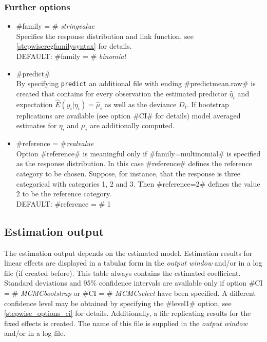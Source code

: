 \subsubsection*{Further options}
\label{stepwisereg_further_options}

\begin{itemize}
\item #family = # {\em stringvalue} \\
 Specifies the response distribution and link function, see \autoref{stepwiseregfamilysyntax} for details. \\
DEFAULT: #family = # {\em binomial}
\item  #predict# \\
By specifying {\tt predict} an
additional file with ending #predictmean.raw# is created that contains for
every observation the estimated predictor $\hat \eta_i$ and
expectation $\hat E(y_i | \eta_i) = \hat \mu_i$ as well as the
deviance $D_i$.  If bootstrap replications are available (see option #CI# for details) model averaged estimates for $\eta_i$ and $\mu_i$
are additionally computed.
\item #reference = #{\em realvalue} \\
Option #reference# is meaningful only if  #family=multinomial# is
specified as the response distribution. In this case #reference#
defines the reference category to be chosen. Suppose, for
instance, that the response is three categorical with categories
1, 2 and 3. Then #reference=2# defines the value 2 to be the reference category. \\
DEFAULT: #reference = # 1
\end{itemize}










\subsection{Estimation output}

The estimation output depends on the estimated
model. Estimation results for linear effects are displayed in a
tabular form in the {\em output window} and/or in a log file (if
created before). This table always contains the estimated coefficient.
Standard deviations and  95\% confidence intervals are available only
if option #CI = # {\em MCMCbootstrap} or
#CI = # {\em MCMCselect} have been specified.
A different confidence level may be obtained by specifying the
#level1# option, see \autoref{stepwise_options_ci} for details.
Additionally, a file replicating results for the fixed effects is
created. The name of this file is supplied in the {\em output
window} and/or in a log file.

